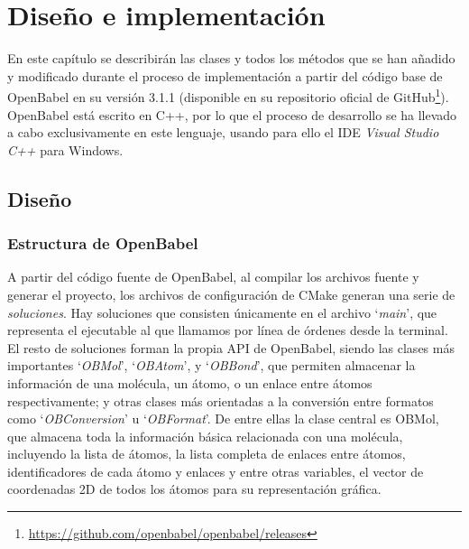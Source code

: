 \chapter{Diseño e implementación}

En este capítulo se describirán las clases y todos los métodos que se han añadido y modificado durante el proceso de implementación a partir del código base de OpenBabel en su versión 3.1.1 (disponible en su repositorio oficial de GitHub\footnote{\url{https://github.com/openbabel/openbabel/releases}}). OpenBabel está escrito en C++, por lo que el proceso de desarrollo se ha llevado a cabo exclusivamente en este lenguaje, usando para ello el IDE \textit{Visual Studio C++} para Windows.


\section{Diseño}

\subsection{Estructura de OpenBabel}

A partir del código fuente de OpenBabel, al compilar los archivos fuente y generar el proyecto, los archivos de configuración de CMake generan una serie de \emph{soluciones}. Hay soluciones que consisten únicamente en el archivo `\textit{main}', que representa el ejecutable al que llamamos por línea de órdenes desde la terminal. El resto de soluciones forman la propia API de OpenBabel, siendo las clases más importantes `\textit{OBMol}', `\textit{OBAtom}', y `\textit{OBBond}', que permiten almacenar la información de una molécula, un átomo, o un enlace entre átomos respectivamente; y otras clases más orientadas a la conversión entre formatos como `\textit{OBConversion}' u `\textit{OBFormat}'. De entre ellas la clase central es OBMol, que almacena toda la información básica relacionada con una molécula, incluyendo la lista de átomos, la lista completa de enlaces entre átomos, identificadores de cada átomo y enlaces y entre otras variables, el vector de coordenadas 2D de todos los átomos para su representación gráfica.

